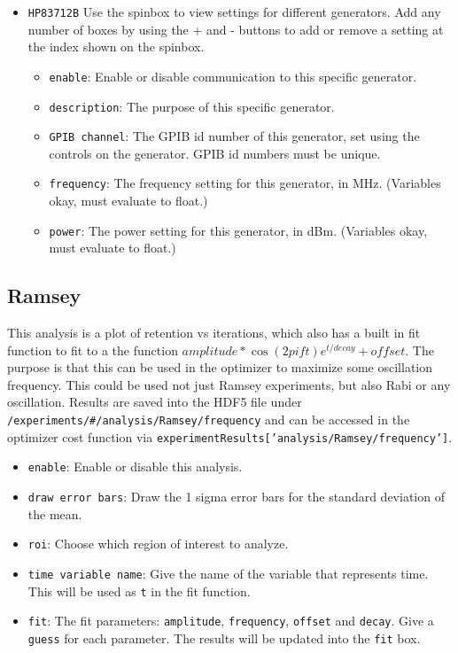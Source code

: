 \documentclass[pdftex,11pt,letterpaper]{article}
\begin{document}
\begin{itemize}
\item \texttt{HP83712B}
Use the spinbox to view settings for different generators.  Add any number of boxes by using the  + and - buttons to add or remove a setting at the index shown on the spinbox.
\begin{itemize}
\item \texttt{enable}:  Enable or disable communication to this specific generator.
\item \texttt{description}:  The purpose of this specific generator.
\item \texttt{GPIB channel}:  The GPIB id number of this generator, set using the controls on the generator.  GPIB id numbers must be unique.
\item \texttt{frequency}:  The frequency setting for this generator, in MHz.  (Variables okay, must evaluate to float.)
\item \texttt{power}:  The power setting for this generator, in dBm.  (Variables okay, must evaluate to float.)
\end{itemize}

\end{itemize}

\subsection{Ramsey}

This analysis is a plot of retention vs iterations, which also has a built in fit function to fit to a the function $\mathit{amplitude}*\cos(2 pi f t) e^{t/\mathit{decay}}+\mathit{offset}$.  The purpose is that this can be used in the optimizer to maximize some oscillation frequency.  This could be used not just Ramsey experiments, but also Rabi or any oscillation.  Results are saved into the HDF5 file under \texttt{/experiments/\#/analysis/Ramsey/frequency} and can be accessed in the optimizer cost function via \texttt{experimentResults['analysis/Ramsey/frequency']}.

\begin{itemize}
\item \texttt{enable}:  Enable or disable this analysis.
\item \texttt{draw error bars}:  Draw the 1 sigma error bars for the standard deviation of the mean.
\item \texttt{roi}:  Choose which region of interest to analyze.
\item \texttt{time variable name}:  Give the name of the variable that represents time.  This will be used as \texttt{t} in the fit function.
\item \texttt{fit}:  The fit parameters: \texttt{amplitude}, \texttt{frequency}, \texttt{offset} and \texttt{decay}.  Give a \texttt{guess} for each parameter.  The results will be updated into the \texttt{fit} box.
\end{itemize}
\end{document}
